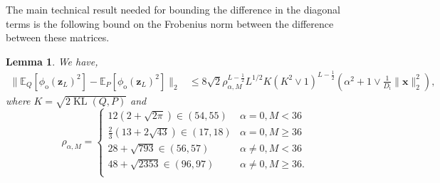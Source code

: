 \documentclass[twoside]{article}
\renewcommand{\ss}[1]{_{\text{#1}}}
\newcommand{\vx}{\mathbf{x}}
\newcommand{\vz}{\mathbf{z}}
\newcommand{\mPhi}{\mathbf{\Phi}}
\newcommand{\E}{\mathbb{E}}
\renewcommand{\P}{\mathbb{P}}
\newcommand{\Q}{\mathbb{Q}}
\renewcommand{\Q}{\ensuremath{Q}}
\renewcommand{\P}{\ensuremath{P}}
\newcommand{\T}{\text{\textsf{T}}}
\newcommand{\KL}{\operatorname{KL}}
\renewcommand{\ss}[1]{_{\text{#1}}}        %
\theoremstyle{theoremstyle}
\newtheorem{lemma}[theorem]{Lemma}
\begin{document}
The main technical result needed for bounding the difference in the diagonal terms is the following bound on the Frobenius norm between the difference between these matrices.
\begin{lemma}\label{lem:diag-frob-norm}
    We have,
    \begin{align}
        \|\E_{\Q}[\phi\ss{o}(\vz_{L})^2 ]- \E_{\P}[\phi\ss{o}(\vz_{L})^2]\|_2
        &\le 8 \sqrt{2} \rho_{\alpha, M}^{L-\tfrac12} L^{1/2} K (K^2 \lor 1)^{L-\tfrac12}\left(\alpha^2 + 1\lor \tfrac1{D\ss{i}}\|\vx\|^2_2\right),
    \end{align}
    where $K = \sqrt{2 \KL(\Q, \P)}$ and 
    \begin{equation}
        \rho_{\alpha, M} =
        \begin{cases}
        12(2+\sqrt{2\pi}) \in (54,55) & \alpha=0, M<36 \\
        \tfrac23(13+2\sqrt{43}) \in (17,18) & \alpha=0, M\ge 36 \\
        28 + \sqrt{793} \in (56,57) & \alpha\neq 0, M<36 \\
        48 + \sqrt{2353} \in (96,97) & \alpha\neq 0, M\ge 36. \\
    \end{cases}
\end{equation}
\end{lemma}
\end{document}
